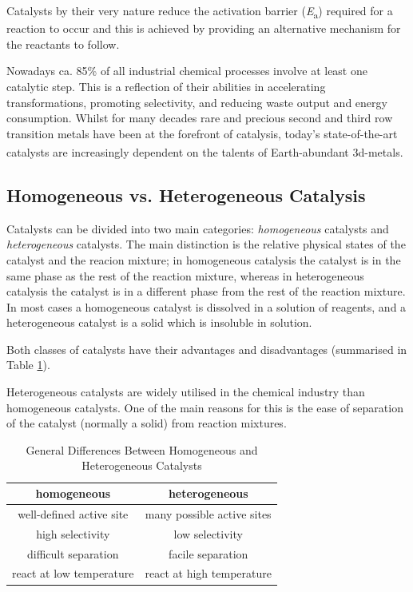 Catalysts by their very nature reduce the activation barrier (\textit{E}\textsubscript{a}) required for a reaction to occur and this is achieved by providing an alternative mechanism for the reactants to follow.

Nowadays ca. 85\% of all industrial chemical processes involve at least one catalytic step. This is a reflection of their abilities in accelerating transformations, promoting selectivity, and reducing waste output and energy consumption. Whilst for many decades rare and precious second and third row transition metals have been at the forefront of catalysis, today's state-of-the-art catalysts are increasingly dependent on the talents of Earth-abundant 3d-metals.\textsuperscript{\cite{hapke:2020}}

\subsection{Homogeneous vs. Heterogeneous Catalysis}

Catalysts can be divided into two main categories: \textit{homogeneous} catalysts and \textit{heterogeneous} catalysts. The main distinction is the relative physical states of the catalyst and the reacion mixture; in homogeneous catalysis the catalyst is in the same phase as the rest of the reaction mixture, whereas in heterogeneous catalysis the catalyst is in a different phase from the rest of the reaction mixture. In most cases a homogeneous catalyst is dissolved in a solution of reagents, and a heterogeneous catalyst is a solid which is insoluble in solution.

Both classes of catalysts have their advantages and disadvantages (summarised in Table \ref{tab:comparison}).

Heterogeneous catalysts are widely utilised in the chemical industry than homogeneous catalysts. One of the main reasons for this is the ease of separation of the catalyst (normally a solid) from reaction mixtures.

\begin{table}[h!]
\centering
\caption[General Differences Between Homogeneous and Heterogeneous Catalysts]{General Differences Between Homogeneous and Heterogeneous Catalysts}
\begin{tabular}{ c c }
\toprule
homogeneous & heterogeneous \\
\midrule
 well-defined active site & many possible active sites \\
 high selectivity & low selectivity \\
 difficult separation & facile separation \\
 react at low temperature & react at high temperature \\
\bottomrule
\end{tabular}
\label{tab:comparison}
\end{table}

